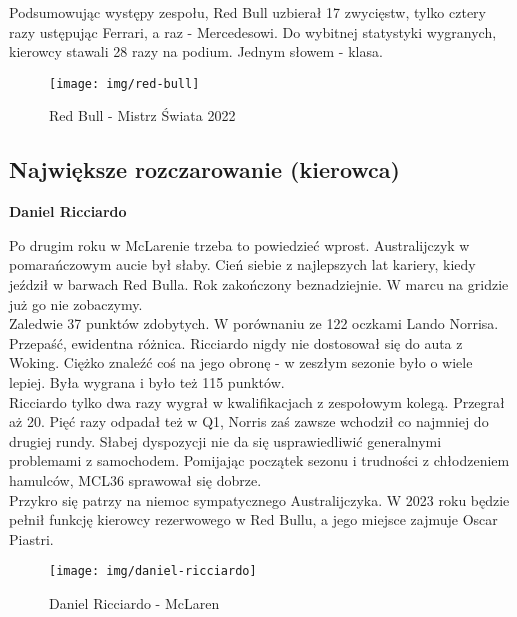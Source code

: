 \documentclass[12pt]{article}
\begin{document}
        Podsumowując występy zespołu, Red Bull uzbierał 17 zwycięstw, tylko cztery razy ustępując Ferrari, a raz - Mercedesowi. Do wybitnej statystyki wygranych, kierowcy stawali 28 razy na podium. Jednym słowem - klasa. 

        \begin{figure}[ht]
            \centering
            \texttt{[image: img/red-bull]}
            \caption{Red Bull - Mistrz Świata 2022}
            \label{fig:rbr}
        \end{figure}
   
    \newpage 
    \subsection{Największe rozczarowanie (kierowca)}
        \begin{center}
            \Huge \textbf{Daniel Ricciardo}
        \end{center}

        Po drugim roku w McLarenie trzeba to powiedzieć wprost. Australijczyk w pomarańczowym aucie był słaby. Cień siebie z najlepszych lat kariery, kiedy jeździł w barwach Red Bulla. Rok zakończony beznadziejnie. W marcu na gridzie już go nie zobaczymy.\\

        Zaledwie 37 punktów zdobytych. W porównaniu ze 122 oczkami Lando Norrisa. Przepaść, ewidentna różnica. Ricciardo nigdy nie dostosował się do auta z Woking. Ciężko znaleźć coś na jego obronę - w zeszłym sezonie było o wiele lepiej. Była wygrana i było też 115 punktów.\\
        
        Ricciardo tylko dwa razy wygrał w kwalifikacjach z zespołowym kolegą. Przegrał aż 20. Pięć razy odpadał też w Q1, Norris zaś zawsze wchodził co najmniej do drugiej rundy. Słabej dyspozycji nie da się usprawiedliwić generalnymi problemami z samochodem. Pomijając początek sezonu i trudności z chłodzeniem hamulców, MCL36 sprawował się dobrze.\\
        
        Przykro się patrzy na niemoc sympatycznego Australijczyka. W 2023 roku będzie pełnił funkcję kierowcy rezerwowego w Red Bullu, a jego miejsce zajmuje Oscar Piastri.\\

        \begin{figure}[ht]
            \centering
            \texttt{[image: img/daniel-ricciardo]}
            \caption{Daniel Ricciardo - McLaren}
            \label{fig:ricc}
        \end{figure}
        
\end{document}
